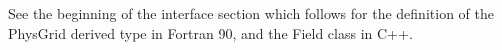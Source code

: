 %


See the beginning of the interface section which
follows for the definition of the PhysGrid derived type
in Fortran 90, and the Field class in C++.


